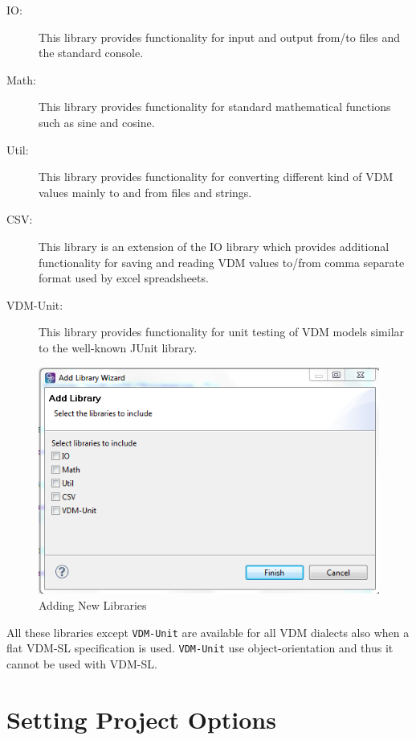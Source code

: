 \documentclass{overturerepchap}
\begin{document}
\begin{description}
\item[IO:] This library provides functionality for input and output
  from/to files and the standard console.
\item[Math:] This library provides functionality for standard
  mathematical functions such as sine and cosine.
\item[Util:] This library provides functionality for converting
  different kind of VDM values mainly to and from files and strings.
\item[CSV:] This library is an extension of the IO library which
  provides additional functionality for saving and reading VDM values
  to/from comma separate format used by excel spreadsheets.
\item[VDM-Unit:] This library provides functionality for unit testing
  of VDM models similar to the well-known JUnit library.
\end{description}

\begin{figure}[!htb]
	\begin{center}
	  \includegraphics[scale=0.8]{figures/NewLibraries}
	  \caption[Adding New Libraries]{Adding New Libraries}
	  \label{fig:NewLibraries}
	\end{center}
\end{figure}

All these libraries except \texttt{VDM-Unit} are available for all VDM dialects also when a flat
VDM-SL specification is used. \texttt{VDM-Unit} use object-orientation and thus it cannot be used with VDM-SL.

\section{Setting Project Options}\label{subsec:options}
\end{document}

